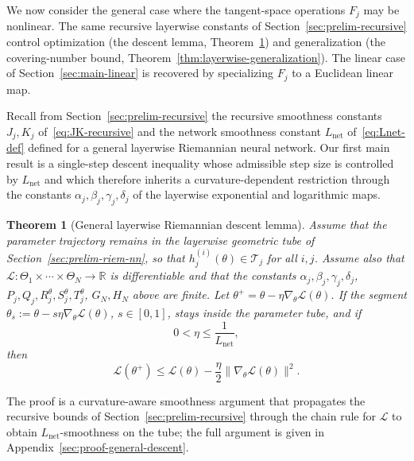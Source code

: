 \documentclass[letterpaper]{article}
\newtheorem{theorem}{Theorem}
\begin{document}
We now consider the general case where the tangent-space operations
$F_j$ may be nonlinear. The same recursive layerwise constants of
Section~\ref{sec:prelim-recursive} control optimization (the descent
lemma, Theorem~\ref{thm:general-descent}) and generalization (the
covering-number bound, Theorem~\ref{thm:layerwise-generalization}). The
linear case of Section~\ref{sec:main-linear} is recovered by
specializing $F_j$ to a Euclidean linear map.

Recall from Section~\ref{sec:prelim-recursive} the recursive smoothness
constants $J_j, K_j$ of~\eqref{eq:JK-recursive} and the network smoothness
constant $L_{\mathrm{net}}$ of~\eqref{eq:Lnet-def} defined for a general
layerwise Riemannian neural network. Our first main result is a
single-step descent inequality whose admissible step size is controlled
by $L_{\mathrm{net}}$ and which therefore inherits a curvature-dependent
restriction through the constants $\alpha_j,\beta_j,\gamma_j,\delta_j$ of
the layerwise exponential and logarithmic maps.

\begin{theorem}[General layerwise Riemannian descent lemma]
\label{thm:general-descent}
Assume that the parameter trajectory remains in the layerwise geometric
tube of Section~\ref{sec:prelim-riem-nn}, so that \(h_j^{(i)}(\theta)\in
\mathcal T_j\) for all \(i,j\). Assume also that
\(\mathcal L:\Theta_1\times\cdots\times\Theta_N\to\mathbb R\) is
differentiable and that the constants $\alpha_j, \beta_j, \gamma_j,
\delta_j$, $P_j, Q_j, R_j^\theta, S_j^\theta, T_j^\theta$, $G_N, H_N$ above
are finite. Let \(\theta^+ = \theta-\eta\nabla_\theta\mathcal L(\theta)\).
If the segment \(\theta_s:=\theta-s\eta\nabla_\theta\mathcal L(\theta)\),
\(s\in[0,1]\), stays inside the parameter tube, and if
\begin{equation}
\label{eq:general-stepsize}
0<\eta\le \frac1{L_{\mathrm{net}}},
\end{equation}
then
\begin{equation}
\label{eq:general-descent}
\mathcal L(\theta^+)
\le
\mathcal L(\theta)
-
\frac{\eta}{2}
\|\nabla_\theta\mathcal L(\theta)\|^2.
\end{equation}
\end{theorem}

The proof is a curvature-aware smoothness argument that propagates the
recursive bounds of Section~\ref{sec:prelim-recursive} through the chain
rule for $\mathcal L$ to obtain \(L_{\mathrm{net}}\)-smoothness on the
tube; the full argument is given in
Appendix~\ref{sec:proof-general-descent}.
\end{document}
